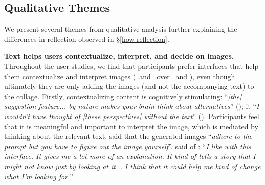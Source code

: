 

\subsection{Qualitative Themes}
\label{qualitative-themes}

We present several themes from qualitative analysis further explaining the differences in reflection observed in \S\ref{how-reflection}.


\textbf{Text helps users contextualize, interpret, and decide on images.} 
Throughout the user studies, we find that participants prefer interfaces that help them contextualize and interpret images (~and \agonistic~over \baseline~and \diverse), even though ultimately they are only adding the images (and not the accompanying text) to the collage.
Firstly, contextualizing content is cognitively stimulating: 
``\textit{[the] suggestion feature... by nature makes your brain think about alternatives}'' ();
it ``\textit{I wouldn’t have thought of [these perspectives] without the text}'' ().
Participants feel that it is meaningful and important to interpret the image, which is mediated by thinking about the relevant text.
 said that the generated images ``\textit{adhere to the prompt but you have to figure out the image yourself}''.
 said of : ``\textit{I like with this interface. It gives me a lot more of an explanation. It kind of tells a story that I might not know just by looking at it... I think that it could help me kind of change what I'm looking for.}''

